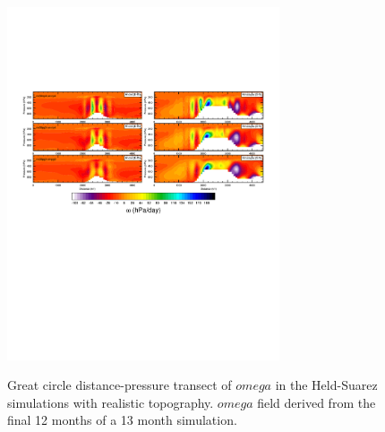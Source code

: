 \documentclass[twocol]{ametsoc}
\begin{document}
\begin{figure}[t]
\noindent\includegraphics[width=19pc,angle=0]{figs/FHS-transect-CROP.pdf}\\
\caption{Great circle distance-pressure transect of $omega$ in the Held-Suarez simulations with realistic topography. $omega$ field derived from the final 12 months of a 13 month simulation.}
\label{fig:FHS-transect}
\end{figure}
\end{document}
